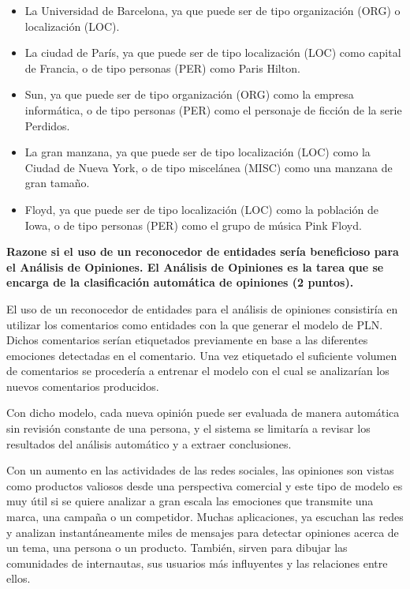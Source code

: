 \documentclass[11pt]{exam}
\begin{document}
\begin{questions}
\begin{itemize}
	\item La Universidad de Barcelona, ya que puede ser de tipo organización (ORG) o localización (LOC).
	\item La ciudad de París, ya que puede ser de tipo localización (LOC) como capital de Francia, o de tipo personas (PER) como Paris Hilton.
	\item Sun, ya que puede ser de tipo organización (ORG) como la empresa informática, o de tipo personas (PER) como el personaje de ficción de la serie Perdidos.
	\item La gran manzana, ya que puede ser de tipo localización (LOC) como la Ciudad de Nueva York, o de tipo miscelánea (MISC) como una manzana de gran tamaño.
	\item Floyd, ya que puede ser de tipo localización (LOC) como la población de Iowa, o de tipo personas (PER) como el grupo de música Pink Floyd.
\end{itemize}

{\bf \question Razone si el uso de un reconocedor de entidades sería beneficioso para el Análisis de Opiniones. El Análisis de Opiniones es la tarea que se encarga de la clasificación automática de opiniones (2 puntos).}

El uso de un reconocedor de entidades para el análisis de opiniones consistiría en utilizar los comentarios como entidades con la que generar el modelo de PLN. Dichos comentarios serían etiquetados previamente en base a las diferentes emociones detectadas en el comentario. Una vez etiquetado el suficiente volumen de comentarios se procedería a entrenar el modelo con el cual se analizarían los nuevos comentarios producidos.

Con dicho modelo, cada nueva opinión puede ser evaluada de manera automática sin revisión constante de una persona, y el sistema se limitaría a revisar los resultados del análisis automático y a extraer conclusiones.

Con un aumento en las actividades de las redes sociales, las opiniones son vistas como productos valiosos desde una perspectiva comercial y este tipo de modelo es muy útil si se quiere analizar a gran escala las emociones que transmite una marca, una campaña o un competidor. Muchas aplicaciones, ya escuchan las redes y analizan instantáneamente miles de mensajes para detectar opiniones acerca de un tema, una persona o un producto. También, sirven para dibujar las comunidades de internautas, sus usuarios más influyentes y las relaciones entre ellos.

\end{questions}
\end{document}
